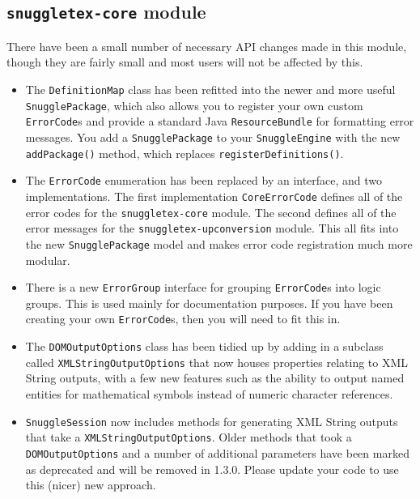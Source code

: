 
\subsection*{\verb|snuggletex-core| module}

There have been a small number of necessary API changes made in this module,
though they are fairly small and most users will not be affected by this.

\begin{itemize}

\item The \verb|DefinitionMap| class has been refitted into the newer and more useful
\verb|SnugglePackage|, which also allows you to register your own custom \verb|ErrorCode|s
and provide a standard Java \verb|ResourceBundle| for formatting error messages. You add
a \verb|SnugglePackage| to your \verb|SnuggleEngine| with the new \verb|addPackage()| method,
which replaces \verb|registerDefinitions()|.

\item The \verb|ErrorCode| enumeration has been replaced by an interface, and two
implementations. The first implementation \verb|CoreErrorCode| defines all of the error
codes for the \verb|snuggletex-core| module. The second defines all of the error messages
for the \verb|snuggletex-upconversion| module. This all fits into the new \verb|SnugglePackage|
model and makes error code registration much more modular.

\item There is a new \verb|ErrorGroup| interface for grouping \verb|ErrorCode|s into logic groups.
This is used mainly for documentation purposes. If you have been creating your own
\verb|ErrorCode|s, then you will need to fit this in.

\item The \verb|DOMOutputOptions| class has been tidied up by adding in a subclass called
\verb|XMLStringOutputOptions| that now houses properties relating to XML String outputs,
with a few new features such as the ability to output named entities for mathematical symbols
instead of numeric character references.

\item \verb|SnuggleSession| now includes methods for generating XML String outputs that take
a \verb|XMLStringOutputOptions|. Older methods that took a \verb|DOMOutputOptions| and a number
of additional parameters have been marked as deprecated and will be removed in
1.3.0. Please update your code to use this (nicer) new approach.


\end{itemize}
